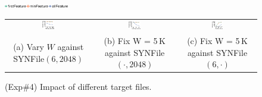
\begin{figure}[t]
    \centering
    \includegraphics[width=0.25\textwidth]{pic/featurespy/plot/detection/trade-off/trade_off_legend.pdf}
    \vspace{5pt}\\
    \begin{tabular}{@{\ }c@{\ }c@{\ }c}
        \includegraphics[width=0.15\textwidth]{pic/featurespy/plot/detection/trade-off/varyWindow_linux.pdf} &
        \includegraphics[width=0.15\textwidth]{pic/featurespy/plot/detection/trade-off/varyModifyPos_linux.pdf}&
        \includegraphics[width=0.15\textwidth]{pic/featurespy/plot/detection/trade-off/varyFileNumber_linux.pdf} \\
        \makecell[c]{\small (a) Vary $W$ \\ \small against SYNFile$(6, 2048)$} &
        \makecell[c]{\small (b) Fix W = 5\,K \\ \small against SYNFile$(\cdot, 2048)$} &
        \makecell[c]{\small (c) Fix W = 5\,K \\ \small against SYNFile$(6, \cdot)$} \\
    \end{tabular}
    \vspace{-6pt}
    \caption{(Exp\#4) Impact of different target files.}
    \vspace{-6pt}
    \label{fig:expDetectionTradeOff}
\end{figure}

